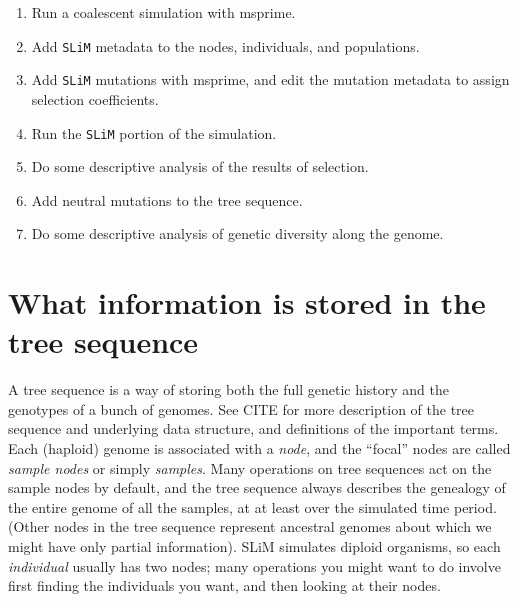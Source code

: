 \documentclass[12pt]{article}
\newcommand{\slim}[0]{\texttt{SLiM}\xspace}
\begin{document}
\begin{enumerate}
    \item Run a coalescent simulation with msprime.

    \item Add \slim metadata to the nodes, individuals, and populations.

    \item Add \slim mutations with msprime, and edit the mutation metadata to assign selection coefficients.

    \item Run the \slim portion of the simulation.

    \item Do some descriptive analysis of the results of selection.

    \item Add neutral mutations to the tree sequence.

    \item Do some descriptive analysis of genetic diversity along the genome.
\end{enumerate}

\section*{What information is stored in the tree sequence}

A tree sequence is a way of storing both the full genetic history and the genotypes
of a bunch of genomes.
See CITE
for more description of the tree sequence and underlying data structure,
and definitions of the important terms.
Each (haploid) genome is associated with a \textit{node},
and the ``focal'' nodes are called \textit{sample nodes} or simply \textit{samples}.
Many operations on tree sequences act on the sample nodes by default,
and the tree sequence always describes the genealogy of the
entire genome of all the samples, at at least over the simulated time period.
(Other nodes in the tree sequence represent ancestral genomes
about which we might have only partial information).
SLiM simulates diploid organisms, so each \textit{individual} usually has two nodes;
many operations you might want to do involve first finding the individuals you want,
and then looking at their nodes.
\end{document}
